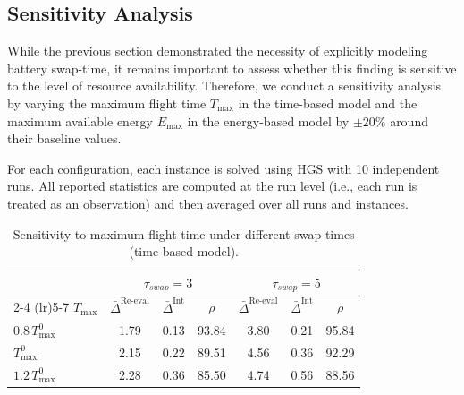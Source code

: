 \documentclass[3p, authoryear, 11pt]{elsarticle}
\begin{document}

\subsection{Sensitivity Analysis}
\label{sec:sensitivity_alalysis}

While the previous section demonstrated the necessity of explicitly modeling battery swap-time, it remains important to assess whether this finding is sensitive to the level of resource availability. Therefore, we conduct a sensitivity analysis by varying the maximum flight time $T_{\max}$ in the time-based model and the maximum available energy $E_{\max}$ in the energy-based model by $\pm 20\%$ around their baseline values.

For each configuration, each instance is solved using HGS with 10 independent runs. All reported statistics are computed at the run level (i.e., each run is treated as an observation) and then averaged over all runs and instances. 


\begin{table}[H]
\centering
\caption{Sensitivity to maximum flight time under different swap-times (time-based model).}
\label{tab:sensitivity_flight_time}
\scriptsize
\begin{tabular}{lcccccc}
\toprule
& \multicolumn{3}{c}{$\tau_{swap}=3$} &
  \multicolumn{3}{c}{$\tau_{swap}=5$} \\
\cmidrule(lr){2-4} \cmidrule(lr){5-7}
$T_{\max}$ &
$\bar{\Delta}^{\mathrm{Re\text{-}eval}}$ &
$\bar{\Delta}^{\mathrm{Int}}$ &
$\bar{\rho}$ &
$\bar{\Delta}^{\mathrm{Re\text{-}eval}}$ &
$\bar{\Delta}^{\mathrm{Int}}$ &
$\bar{\rho}$ \\
\midrule
$0.8\,T_{\max}^{0}$ & 1.79 & 0.13 & 93.84 & 3.80 & 0.21 & 95.84 \\
$T_{\max}^{0}$     & 2.15 & 0.22 & 89.51 & 4.56  & 0.36 & 92.29 \\
$1.2\,T_{\max}^{0}$ & 2.28 & 0.36 & 85.50 & 4.74  & 0.56 & 88.56 \\
\bottomrule
\end{tabular}
\end{table}
\end{document}
